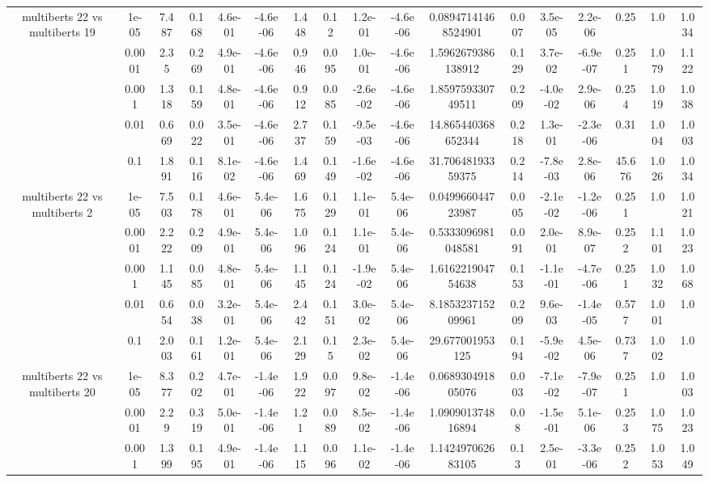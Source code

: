 \begin{tabular}{|c|c|c|c|c|c|c|c|c|c|c|c|c|c|c|c|c|}
\hline
\multirow{5}{*}{multiberts 22 vs multiberts 19} & 1e-05 & 7.487 & 0.168 & 4.6e-01 & -4.6e-06 & 1.448 & 0.12 & 1.2e-01 & -4.6e-06 & 0.08947141468524901 & 0.007 & 3.5e-05 & 2.2e-06 & 0.25 & 1.0 & 1.034 \\
 & 0.0001 & 2.35 & 0.269 & 4.9e-01 & -4.6e-06 & 0.946 & 0.095 & 1.0e-01 & -4.6e-06 & 1.5962679386138912 & 0.129 & 3.7e-02 & -6.9e-07 & 0.251 & 1.079 & 1.122 \\
 & 0.001 & 1.318 & 0.159 & 4.8e-01 & -4.6e-06 & 0.912 & 0.085 & -2.6e-02 & -4.6e-06 & 1.859759330749511 & 0.209 & -4.0e-02 & 2.9e-06 & 0.254 & 1.019 & 1.038 \\
 & 0.01 & 0.669 & 0.022 & 3.5e-01 & -4.6e-06 & 2.737 & 0.159 & -9.5e-03 & -4.6e-06 & 14.865440368652344 & 0.218 & 1.3e-01 & -2.3e-06 & 0.31 & 1.004 & 1.003 \\
 & 0.1 & 1.891 & 0.116 & 8.1e-02 & -4.6e-06 & 1.469 & 0.149 & -1.6e-02 & -4.6e-06 & 31.70648193359375 & 0.214 & -7.8e-03 & 2.8e-06 & 45.676 & 1.026 & 1.034 \\
\hline
\multirow{5}{*}{multiberts 22 vs multiberts 2} & 1e-05 & 7.503 & 0.178 & 4.6e-01 & 5.4e-06 & 1.675 & 0.129 & 1.1e-01 & 5.4e-06 & 0.049966044723987 & 0.005 & -2.1e-02 & -1.2e-06 & 0.251 & 1.0 & 1.021 \\
 & 0.0001 & 2.222 & 0.209 & 4.9e-01 & 5.4e-06 & 1.096 & 0.124 & 1.1e-01 & 5.4e-06 & 0.5333096981048581 & 0.091 & 2.0e-01 & 8.9e-07 & 0.252 & 1.101 & 1.023 \\
 & 0.001 & 1.145 & 0.085 & 4.8e-01 & 5.4e-06 & 1.145 & 0.124 & -1.9e-02 & 5.4e-06 & 1.616221904754638 & 0.153 & -1.1e-01 & -4.7e-06 & 0.251 & 1.032 & 1.068 \\
 & 0.01 & 0.654 & 0.038 & 3.2e-01 & 5.4e-06 & 2.442 & 0.151 & 3.0e-02 & 5.4e-06 & 8.185323715209961 & 0.209 & 9.6e-03 & -1.4e-05 & 0.577 & 1.001 & 1.0 \\
 & 0.1 & 2.003 & 0.161 & 1.2e-01 & 5.4e-06 & 2.129 & 0.15 & 2.3e-02 & 5.4e-06 & 29.677001953125 & 0.194 & -5.9e-02 & 4.5e-06 & 0.737 & 1.002 & 1.0 \\
\hline
\multirow{5}{*}{multiberts 22 vs multiberts 20} & 1e-05 & 8.377 & 0.202 & 4.7e-01 & -1.4e-06 & 1.922 & 0.097 & 9.8e-02 & -1.4e-06 & 0.068930491805076 & 0.003 & -7.1e-02 & -7.9e-07 & 0.251 & 1.0 & 1.003 \\
 & 0.0001 & 2.29 & 0.319 & 5.0e-01 & -1.4e-06 & 1.21 & 0.089 & 8.5e-02 & -1.4e-06 & 1.090901374816894 & 0.08 & -1.5e-01 & 5.1e-06 & 0.253 & 1.075 & 1.023 \\
 & 0.001 & 1.399 & 0.195 & 4.9e-01 & -1.4e-06 & 1.115 & 0.096 & 1.1e-02 & -1.4e-06 & 1.142497062683105 & 0.13 & 2.5e-01 & -3.3e-06 & 0.252 & 1.053 & 1.049 \\

\end{tabular}

